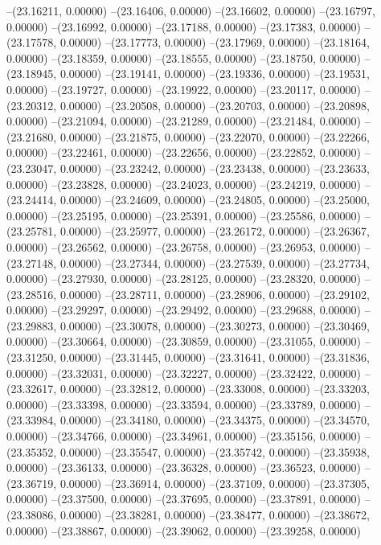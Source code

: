 --(23.16211, 0.00000)
--(23.16406, 0.00000)
--(23.16602, 0.00000)
--(23.16797, 0.00000)
--(23.16992, 0.00000)
--(23.17188, 0.00000)
--(23.17383, 0.00000)
--(23.17578, 0.00000)
--(23.17773, 0.00000)
--(23.17969, 0.00000)
--(23.18164, 0.00000)
--(23.18359, 0.00000)
--(23.18555, 0.00000)
--(23.18750, 0.00000)
--(23.18945, 0.00000)
--(23.19141, 0.00000)
--(23.19336, 0.00000)
--(23.19531, 0.00000)
--(23.19727, 0.00000)
--(23.19922, 0.00000)
--(23.20117, 0.00000)
--(23.20312, 0.00000)
--(23.20508, 0.00000)
--(23.20703, 0.00000)
--(23.20898, 0.00000)
--(23.21094, 0.00000)
--(23.21289, 0.00000)
--(23.21484, 0.00000)
--(23.21680, 0.00000)
--(23.21875, 0.00000)
--(23.22070, 0.00000)
--(23.22266, 0.00000)
--(23.22461, 0.00000)
--(23.22656, 0.00000)
--(23.22852, 0.00000)
--(23.23047, 0.00000)
--(23.23242, 0.00000)
--(23.23438, 0.00000)
--(23.23633, 0.00000)
--(23.23828, 0.00000)
--(23.24023, 0.00000)
--(23.24219, 0.00000)
--(23.24414, 0.00000)
--(23.24609, 0.00000)
--(23.24805, 0.00000)
--(23.25000, 0.00000)
--(23.25195, 0.00000)
--(23.25391, 0.00000)
--(23.25586, 0.00000)
--(23.25781, 0.00000)
--(23.25977, 0.00000)
--(23.26172, 0.00000)
--(23.26367, 0.00000)
--(23.26562, 0.00000)
--(23.26758, 0.00000)
--(23.26953, 0.00000)
--(23.27148, 0.00000)
--(23.27344, 0.00000)
--(23.27539, 0.00000)
--(23.27734, 0.00000)
--(23.27930, 0.00000)
--(23.28125, 0.00000)
--(23.28320, 0.00000)
--(23.28516, 0.00000)
--(23.28711, 0.00000)
--(23.28906, 0.00000)
--(23.29102, 0.00000)
--(23.29297, 0.00000)
--(23.29492, 0.00000)
--(23.29688, 0.00000)
--(23.29883, 0.00000)
--(23.30078, 0.00000)
--(23.30273, 0.00000)
--(23.30469, 0.00000)
--(23.30664, 0.00000)
--(23.30859, 0.00000)
--(23.31055, 0.00000)
--(23.31250, 0.00000)
--(23.31445, 0.00000)
--(23.31641, 0.00000)
--(23.31836, 0.00000)
--(23.32031, 0.00000)
--(23.32227, 0.00000)
--(23.32422, 0.00000)
--(23.32617, 0.00000)
--(23.32812, 0.00000)
--(23.33008, 0.00000)
--(23.33203, 0.00000)
--(23.33398, 0.00000)
--(23.33594, 0.00000)
--(23.33789, 0.00000)
--(23.33984, 0.00000)
--(23.34180, 0.00000)
--(23.34375, 0.00000)
--(23.34570, 0.00000)
--(23.34766, 0.00000)
--(23.34961, 0.00000)
--(23.35156, 0.00000)
--(23.35352, 0.00000)
--(23.35547, 0.00000)
--(23.35742, 0.00000)
--(23.35938, 0.00000)
--(23.36133, 0.00000)
--(23.36328, 0.00000)
--(23.36523, 0.00000)
--(23.36719, 0.00000)
--(23.36914, 0.00000)
--(23.37109, 0.00000)
--(23.37305, 0.00000)
--(23.37500, 0.00000)
--(23.37695, 0.00000)
--(23.37891, 0.00000)
--(23.38086, 0.00000)
--(23.38281, 0.00000)
--(23.38477, 0.00000)
--(23.38672, 0.00000)
--(23.38867, 0.00000)
--(23.39062, 0.00000)
--(23.39258, 0.00000)
